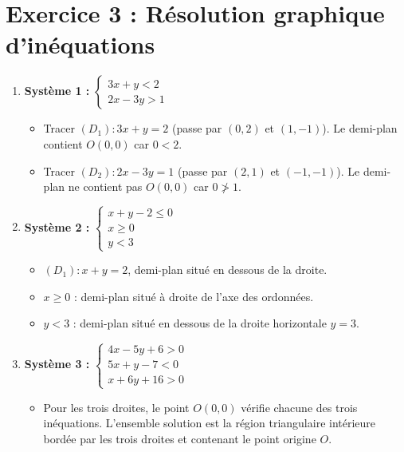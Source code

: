 \documentclass[12pt,a4paper]{article}
\begin{document}
\section*{Exercice 3 : Résolution graphique d'inéquations}

\begin{enumerate}
    \item \textbf{Système 1 :}
    $\begin{cases} 3x + y < 2 \\ 2x - 3y > 1 \end{cases}$
    \begin{itemize}[label=$\bullet$]
        \item Tracer $(D_1) : 3x + y = 2$ (passe par $(0,2)$ et $(1,-1)$). Le demi-plan contient $O(0,0)$ car $0 < 2$.
        \item Tracer $(D_2) : 2x - 3y = 1$ (passe par $(2,1)$ et $(-1,-1)$). Le demi-plan ne contient pas $O(0,0)$ car $0 \ngtr 1$.
    \end{itemize}

    \item \textbf{Système 2 :}
    $\begin{cases} x + y - 2 \le 0 \\ x \ge 0 \\ y < 3 \end{cases}$
    \begin{itemize}[label=$\bullet$]
        \item $(D_1) : x + y = 2$, demi-plan situé en dessous de la droite.
        \item $x \ge 0$ : demi-plan situé à droite de l'axe des ordonnées.
        \item $y < 3$ : demi-plan situé en dessous de la droite horizontale $y = 3$.
    \end{itemize}

    \item \textbf{Système 3 :}
    $\begin{cases} 4x - 5y + 6 > 0 \\ 5x + y - 7 < 0 \\ x + 6y + 16 > 0 \end{cases}$
    \begin{itemize}[label=$\bullet$]
        \item Pour les trois droites, le point $O(0,0)$ vérifie chacune des trois inéquations. L'ensemble solution est la région triangulaire intérieure bordée par les trois droites et contenant le point origine $O$.
    \end{itemize}
\end{enumerate}
\end{document}
